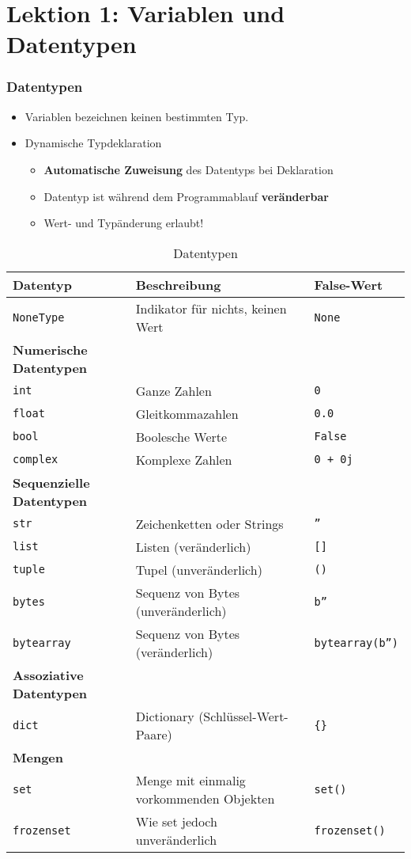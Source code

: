\part*{Lektion 1: Variablen und Datentypen}
\section{Datentypen}
\begin{itemize}
	\item Variablen bezeichnen keinen bestimmten Typ.
	\item Dynamische Typdeklaration
	\begin{itemize}
		\item \textbf{Automatische Zuweisung} des Datentyps bei Deklaration
		\item Datentyp ist während dem Programmablauf \textbf{veränderbar}
		\item Wert- und Typänderung erlaubt!
	\end{itemize}
\end{itemize}
\begin{table}[H]
\begin{threeparttable}
	\caption{Datentypen}
	\label{tab:T_Datentypen}
	\begin{tabular}{|l|l|l|}
		\hline 
		\textbf{Datentyp} &\textbf{Beschreibung} &\textbf{False-Wert}\\
		\hline
		\texttt{NoneType} &Indikator für nichts, keinen Wert &\texttt{None}\\ 
		\hline
		\textbf{Numerische Datentypen}&&\\
		\texttt{int} &Ganze Zahlen &\texttt{0}\\ 
		\texttt{float} &Gleitkommazahlen &\texttt{0.0}\\ 
		\texttt{bool} &Boolesche Werte &\texttt{False}\\ 
		\texttt{complex} &Komplexe Zahlen &\texttt{0 + 0j}\\ 
		\hline 
		\textbf{Sequenzielle Datentypen}&&\\
		\texttt{str} &Zeichenketten oder Strings &\texttt{''}\\
		\texttt{list} &Listen (veränderlich) &\texttt{[]}\\
		\texttt{tuple} &Tupel (unveränderlich) &\texttt{()}\\
		\texttt{bytes} &Sequenz von Bytes (unveränderlich) &\texttt{b''}\\
		\texttt{bytearray} &Sequenz von Bytes (veränderlich) &\texttt{bytearray(b'')}\\
		\hline
		\textbf{Assoziative Datentypen}&&\\
		\texttt{dict} &Dictionary (Schlüssel-Wert-Paare) &\texttt{\{\}}\\
		\hline
		\textbf{Mengen}&&\\
		\texttt{set} &Menge mit einmalig vorkommenden Objekten &\texttt{set()}\\
		\texttt{frozenset} &Wie set jedoch unveränderlich &\texttt{frozenset()}\\
		\hline
	\end{tabular}
\end{threeparttable}
\end{table}
